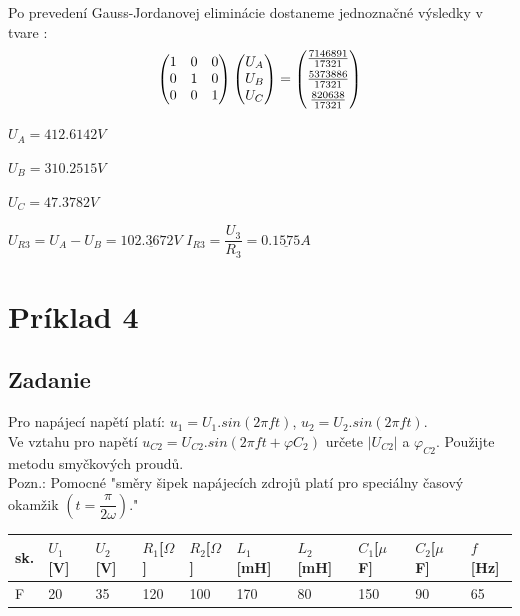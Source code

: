 \documentclass[10pt,a4paper]{article}
\begin{document}
Po prevedení Gauss-Jordanovej eliminácie dostaneme jednoznačné výsledky v tvare :
\[
\begin{pmatrix}
1 & 0 & 0 \\ 0 &1 & 0 \\ 0 & 0 & 1 \\
\end{pmatrix}
\begin{pmatrix}
U_{A} \\ U_{B} \\ U_{C} \\
\end{pmatrix}
=
\begin{pmatrix}
\vspace*{0.1cm} \frac{7146891}{17321} \\ \vspace*{0.1cm}  \frac{5373886}{17321} \\ \frac{820638}{17321} \\
\end{pmatrix}
\]

\vspace*{0.5cm}
$ U_{A}=412.6142 V $

$ U_{B}= 310.2515 V $

$ U_{C}= 47.3782 V $

\vspace*{0.5cm}

\begin{center}
	$U_{R3} = U_{A} - U_{B} = \underline{102.3672 V} $ \qquad  \qquad
	$I_{R3} = \dfrac{U_{3}}{R_{3}} = \underline{0.1575 A} $
\end{center}


 \newpage
 \section {Príklad 4}
 
 \subsection*{Zadanie}
 Pro napájecí napětí platí: $u_{1}=U_{1}.sin(2\pi ft)$, $u_{2}=U_{2}.sin(2\pi ft)$.\\
 Ve vztahu pro napětí $ u_{C2}=U_{C2}.sin(2\pi ft + \varphi C_{2}) $ určete $|U_{C2}|$ a $\varphi _{C2}$. Použijte metodu smyčkových proudů.\\
 Pozn.: Pomocné "směry šipek napájecích zdrojů platí pro speciálny časový okamžik
 $\left( t=\dfrac{\pi}{2\omega}\right)$."\\
\begin{center}
    \begin{tabular}{ | l | l | l | l | l | l | l | l | l | l | }
    \hline
    sk.& $U_{1}$[V] & $U_{2}$[V] & $R_{1}$[$\Omega$] & $R_{2}$[$\Omega$] & $L_{1}$[mH] & $L_{2}$[mH] & $C_{1}$[$\mu$ F] & $C_{2}$[$\mu$ F]& $f$[Hz] \\ \hline
    F & 20& 35 & 120 & 100 & 170 & 80 & 150 & 90 & 65 \\ \hline
    \end{tabular}
\end{center}
\end{document}
